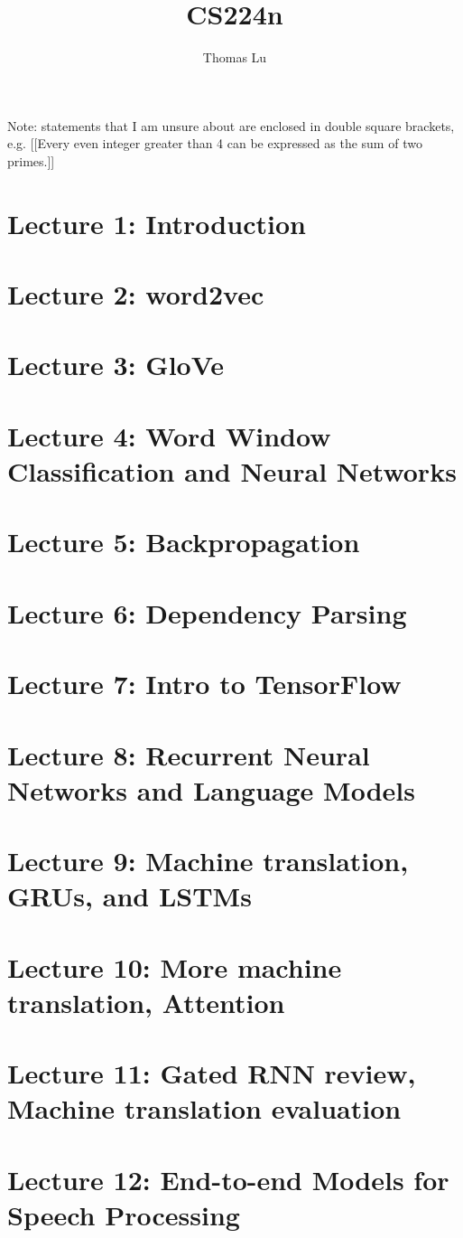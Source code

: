 \documentclass{article}
\title{CS224n}
\author{Thomas Lu}
\date{}
\begin{document}
\maketitle
Note: statements that I am unsure about are enclosed in double square brackets, e.g. [[Every even integer greater than 4 can be expressed as the sum of two primes.]]
\section{Lecture 1: Introduction}

\section{Lecture 2: word2vec}

\section{Lecture 3: GloVe}

\section{Lecture 4: Word Window Classification and Neural Networks}

\section{Lecture 5: Backpropagation}

\section{Lecture 6: Dependency Parsing}

\section{Lecture 7: Intro to TensorFlow}

\section{Lecture 8: Recurrent Neural Networks and Language Models}

\section{Lecture 9: Machine translation, GRUs, and LSTMs}

\section{Lecture 10: More machine translation, Attention}

\section{Lecture 11: Gated RNN review, Machine translation evaluation}

\section{Lecture 12: End-to-end Models for Speech Processing}

\end{document}
